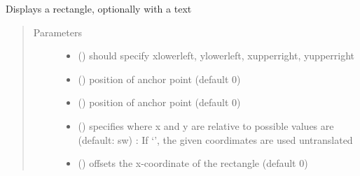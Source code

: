 \documentclass[letterpaper,10pt,english]{sphinxmanual}
\begin{document}
\begin{fulllineitems}
\label{\detokenize{Reference:salabim.AnimateRectangle}}
Displays a rectangle, optionally with a text
\begin{quote}\begin{description}
\item[{Parameters}] \leavevmode\begin{itemize}
\item {} 
 () \textendash{} should specify xlowerleft, ylowerleft, xupperright, yupperright

\item {} 
 () \textendash{} position of anchor point (default 0)

\item {} 
 () \textendash{} position of anchor point (default 0)

\item {} 
 () \textendash{} specifies where x and y are relative to 
possible values are (default: sw) : 
If ‘’, the given coordimates are used untranslated

\item {} 
 () \textendash{} offsets the x-coordinate of the rectangle (default 0)


\end{itemize}
\end{description}
\end{quote}
\end{fulllineitems}
\end{document}
